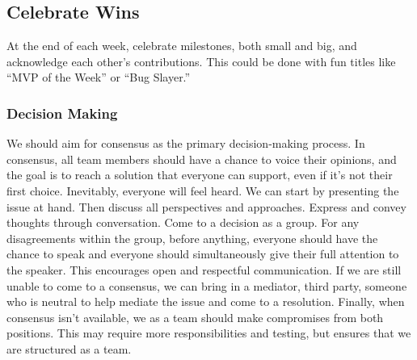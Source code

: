 \documentclass{article}
\begin{document}
\subsection*{Celebrate Wins}
At the end of each week, celebrate milestones, both small and big, and acknowledge each other’s contributions. This could be done with fun titles like “MVP of the Week” or “Bug Slayer.”


\subsubsection*{Decision Making} 

\newline
We should aim for consensus as the primary decision-making process. In consensus, all team members should have a chance to voice their opinions, and the goal is to reach a solution that everyone can support, even if it’s not their first choice. Inevitably, everyone will feel heard. We can start by presenting the issue at hand. Then discuss all perspectives and approaches. Express and convey thoughts through conversation. Come to a decision as a group.
\newline
\newline
For any disagreements within the group, before anything, everyone should have the chance to speak and everyone should simultaneously give their full attention to the speaker. This encourages open and respectful communication. If we are still unable to come to a consensus, we can bring in a mediator, third party, someone who is neutral to help mediate the issue and come to a resolution. Finally, when consensus isn’t available, we as a team should make compromises from both positions. This may require more responsibilities and testing, but ensures that we are structured as a team.
\end{document}
